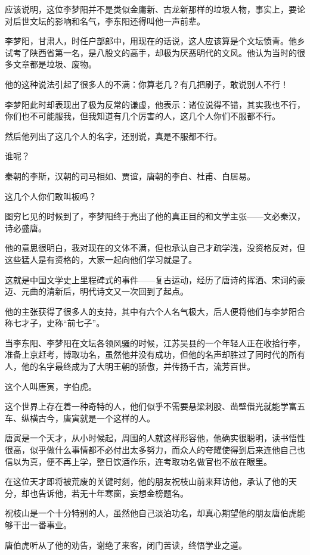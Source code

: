 \begin{multicols}{\theparacolNo}
应该说明，这位李梦阳并不是类似金庸新、古龙新那样的垃圾人物，事实上，要论对后世文坛的影响和名气，李东阳还得叫他一声前辈。

李梦阳，甘肃人，时任户部郎中，用现在的话说，这人应该算是个文坛愤青。他乡试考了陕西省第一名，是八股文的高手，却极为厌恶明代的文风。他认为当时的很多文章都是垃圾、废物。

他的这种说法引起了很多人的不满：你算老几？有几把刷子，敢说别人不行！

李梦阳此时却表现出了极为反常的谦虚，他表示：诸位说得不错，其实我也不行，你们也不可能服我，但我知道有几个厉害的人，这几个人你们不服都不行。

然后他列出了这几个人的名字，还别说，真是不服都不行。

谁呢？

秦朝的李斯，汉朝的司马相如、贾谊，唐朝的李白、杜甫、白居易。

这几个人你们敢叫板吗？

图穷匕见的时候到了，李梦阳终于亮出了他的真正目的和文学主张——文必秦汉，诗必盛唐。

他的意思很明白，我对现在的文体不满，但也承认自己才疏学浅，没资格反对，但这些猛人是有资格的，大家一起向他们学习就是了。

这就是中国文学史上里程碑式的事件——复古运动，经历了唐诗的挥洒、宋词的豪迈、元曲的清新后，明代诗文又一次回到了起点。

他的主张获得了很多人的支持，其中有六个人名气极大，后人便将他们与李梦阳合称七才子，史称“前七子”。

当李东阳、李梦阳在文坛各领风骚的时候，江苏吴县的一个年轻人正在收拾行李，准备上京赶考，博取功名，虽然他并没有成功，但他的名声却胜过了同时代的所有人，他的名字最终成为了大明王朝的骄傲，并传扬千古，流芳百世。

这个人叫唐寅，字伯虎。

这个世界上存在着一种奇特的人，他们似乎不需要悬梁刺股、凿壁借光就能学富五车、纵横古今，唐寅就是一个这样的人。

唐寅是一个天才，从小时候起，周围的人就这样形容他，他确实很聪明，读书悟性很高，似乎做什么事情都不必付出太多努力，而众人的夸耀使得到后来连他自己也信以为真，便不再上学，整日饮酒作乐，连考取功名做官也不放在眼里。

在这位天才即将被荒废的关键时刻，他的朋友祝枝山前来拜访他，承认了他的天分，却也告诉他，若无十年寒窗，妄想金榜题名。

祝枝山是一个十分特别的人，虽然他自己淡泊功名，却真心期望他的朋友唐伯虎能够干出一番事业。

唐伯虎听从了他的劝告，谢绝了来客，闭门苦读，终悟学业之道。


\end{multicols}
